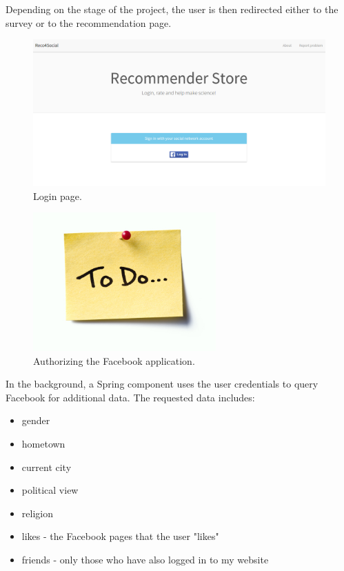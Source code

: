 \documentclass[12pt]{report}
\begin{document}
Depending on the stage of the project, the user is then redirected either to the survey or to the recommendation page. 

\begin{figure}[!t]
\centering
\includegraphics[width=\textwidth]{reco4_login.png} 
\caption[Login page.]{Login page.}
\label{fig.login}
\end{figure}

\begin{figure}[!t]
\centering
\includegraphics[width=7cm]{todo.jpg} 
\caption[Authorizing the Facebook application.]{Authorizing the Facebook application.}
\label{fig.login.fb_app_auth}
\end{figure}

In the background, a Spring component uses the user credentials to query Facebook for additional data. The requested data includes:
\begin{itemize}
\item gender
\item hometown
\item current city
\item political view
\item religion
\item likes - the Facebook pages that the user "likes"
\item friends - only those who have also logged in to my website
\end{itemize}
\end{document}
